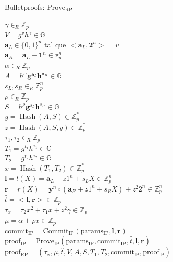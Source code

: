 \begin{minipage}{0.9\textwidth}
    \begin{algorithm}[H]
        \caption{Bulletproofs: $\operatorname{Prove_{RP}}$}
        $\gamma \in_{R} \mathbb{Z}_{p}$ \\
        $V = g^{v}h^{\gamma} \in \mathbb{G}$ \\
        $\mathbf{a}_{L}\in \{0, 1\}^{n}$ tal que $<\mathbf{a}_{L}, \mathbf{2}^{n}> = v$ \\
        $\mathbf{a}_{R} = \mathbf{a}_{L} - \mathbf{1}^{n} \in \mathbb{z}_{p}^{n}$ \\
        $\alpha \in_{R} \mathbb{Z}_{p}$ \\
        $A = h^{\alpha}\mathbf{g}^{\mathbf{a}_{L}}\mathbf{h}^{\mathbf{a}_{R}} \in \mathbb{G}$ \\
        $s_{L}, s_{R} \in_{R} \mathbb{Z}_{p}^{n}$ \\
        $\rho \in_{R} \mathbb{Z}_{p}$ \\
        $S = h^{\rho}\mathbf{g}^{s_{L}}\mathbf{h}^{s_{R}} \in \mathbb{G}$ \\
        $y = \operatorname{Hash}(A, S) \in \mathbb{Z}_{p}^{*}$ \\
        $z = \operatorname{Hash}(A, S, y) \in \mathbb{Z}_{p}^{*}$ \\
        $\tau_{1}, \tau_{2} \in_{R} \mathbb{Z}_{p}$ \\
        $T_{1} = g^{t_{1}}h^{\tau_{1}} \in \mathbb{G}$ \\
        $T_{2} = g^{t_{2}}h^{\tau_{2}} \in \mathbb{G}$ \\
        $x = \operatorname{Hash}(T_{1}, T_{2}) \in \mathbb{Z}_{p}^{*}$ \\
        $\mathbf{l} = l(X) = \mathbf{a}_{L} - z1^{n} + s_{L}X \in \mathbb{Z}_{p}^{n}$ \\
        $\mathbf{r} = r(X) = \mathbf{y}^{n} \circ (\mathbf{a}_{R} + z1^{n}+s_{R}X) + z^{2}2^{n} \in \mathbb{Z}_{p}^{n}$ \\
        $\hat{t} = <\mathbf{l}, \mathbf{r}> \in \mathbb{Z}_{p}$ \\
        $\tau_{x} = \tau_{2}x^{2} + \tau_{1}x + z^{2}\gamma \in \mathbb{Z}_{p}$ \\
        $\mu = \alpha + \rho x \in \mathbb{Z}_{p}$ \\
        $\operatorname{commit_{IP}} = \operatorname{Commit_{IP}}(\operatorname{params_{IP}}, \mathbf{l}, \mathbf{r})$ \\
        $\operatorname{proof_{IP}} = \operatorname{Prove_{IP}}(\operatorname{params_{IP}}, \operatorname{commit_{IP}}, \hat{t}, \mathbf{l}, \mathbf{r})$ \\
        $\operatorname{proof_{RP}} = (\tau_{x}, \mu, \hat{t}, V, A, S, T_{1}, T_{2}, \operatorname{commit_{IP}}, \operatorname{proof_{IP}})$ \\
    \end{algorithm}
\end{minipage}

